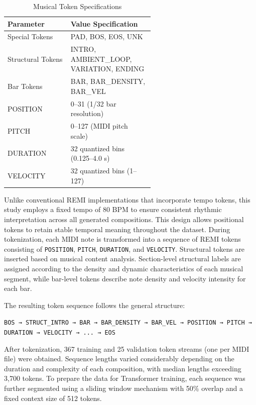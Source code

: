 \documentclass[conference,a4paper]{IEEEtran}
\begin{document}
\begin{table}[htbp]
\centering
\caption{Musical Token Specifications}
\label{tab:musical_params}
\begin{tabular}{l|p{0.58\linewidth}}
\hline
\textbf{Parameter} & \textbf{Value Specification} \\
\hline
Special Tokens      & PAD, BOS, EOS, UNK \\
Structural Tokens   & INTRO, AMBIENT\_LOOP, VARIATION, ENDING \\
Bar Tokens          & BAR, BAR\_DENSITY, BAR\_VEL \\
POSITION            & 0--31 (1/32 bar resolution) \\
PITCH               & 0--127 (MIDI pitch scale) \\
DURATION            & 32 quantized bins (0.125--4.0 s) \\
VELOCITY            & 32 quantized bins (1--127) \\
\hline
\end{tabular}
\end{table}

\noindent Unlike conventional REMI implementations that incorporate tempo tokens, this study employs a fixed tempo of 80 BPM to ensure consistent rhythmic interpretation across all generated compositions. This design allows positional tokens to retain stable temporal meaning throughout the dataset.
During tokenization, each MIDI note is transformed into a sequence of REMI tokens consisting of \texttt{POSITION}, \texttt{PITCH}, \texttt{DURATION}, and \texttt{VELOCITY}. Structural tokens are inserted based on musical content analysis. Section-level structural labels are assigned according to the density and dynamic characteristics of each musical segment, while bar-level tokens describe note density and velocity intensity for each bar.

\noindent The resulting token sequence follows the general structure:

\begin{center}
\texttt{BOS → STRUCT\_INTRO → BAR → BAR\_DENSITY → BAR\_VEL → POSITION → PITCH → DURATION → VELOCITY → ... → EOS}
\end{center}

\noindent After tokenization, 367 training and 25 validation token streams (one per MIDI file) were obtained. Sequence lengths varied considerably depending on the duration and complexity of each composition, with median lengths exceeding 3,700 tokens. To prepare the data for Transformer training, each sequence was further segmented using a sliding window mechanism with 50\% overlap and a fixed context size of 512 tokens.
\end{document}
